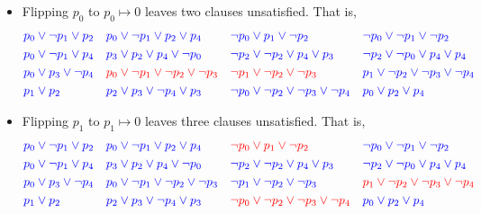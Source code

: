 \documentclass[11pt,a4paper]{article}
\begin{document}
\begin{itemize}
\item Flipping $p_0$ to $p_0 \mapsto 0$ leaves two clauses unsatisfied. That is,
\begin{align*}
&\textcolor{blue}{p_0 \lor \neg p_1 \lor p_2} & & \textcolor{blue}{p_0 \lor \neg p_1 \lor p_2 \lor p_4} & & \textcolor{blue}{\neg p_0 \lor p_1 \lor \neg p_2} & & \textcolor{blue}{\neg p_0 \lor \neg p_1 \lor \neg p_2} \\
&\textcolor{blue}{ p_0 \lor \neg p_1 \lor p_4} && \textcolor{blue}{p_3 \lor p_2 \lor p_4 \lor \neg p_0} && \textcolor{blue}{\neg p_2 \lor \neg p_2 \lor p_4 \lor p_3} && \textcolor{blue}{\neg p_2 \lor \neg p_0 \lor p_4 \lor p_4} \\
& \textcolor{blue}{p_0 \lor p_3 \lor \neg p_4} && \textcolor{red}{p_0 \lor \neg p_1 \lor \neg p_2 \lor \neg p_3} && \textcolor{red}{\neg p_1 \lor \neg p_2 \lor \neg p_3} && \textcolor{blue}{p_1 \lor \neg p_2 \lor \neg p_3 \lor \neg p_4} \\
& \textcolor{blue}{p_1 \lor p_2} && \textcolor{blue}{p_2 \lor p_3 \lor \neg p_4 \lor p_3} && \textcolor{blue}{\neg p_0 \lor \neg p_2 \lor \neg p_3 \lor \neg p_4} && \textcolor{blue}{p_0 \lor p_2 \lor p_4} \\
\end{align*}
\item Flipping $p_1$ to $p_1 \mapsto 0$ leaves three clauses unsatisfied. That is,
\begin{align*}
&\textcolor{blue}{p_0 \lor \neg p_1 \lor p_2} & & \textcolor{blue}{p_0 \lor \neg p_1 \lor p_2 \lor p_4} & & \textcolor{red}{\neg p_0 \lor p_1 \lor \neg p_2} & & \textcolor{blue}{\neg p_0 \lor \neg p_1 \lor \neg p_2} \\
&\textcolor{blue}{ p_0 \lor \neg p_1 \lor p_4} && \textcolor{blue}{p_3 \lor p_2 \lor p_4 \lor \neg p_0} && \textcolor{blue}{\neg p_2 \lor \neg p_2 \lor p_4 \lor p_3} && \textcolor{blue}{\neg p_2 \lor \neg p_0 \lor p_4 \lor p_4} \\
& \textcolor{blue}{p_0 \lor p_3 \lor \neg p_4} && \textcolor{blue}{p_0 \lor \neg p_1 \lor \neg p_2 \lor \neg p_3} && \textcolor{blue}{\neg p_1 \lor \neg p_2 \lor \neg p_3} && \textcolor{red}{p_1 \lor \neg p_2 \lor \neg p_3 \lor \neg p_4} \\
& \textcolor{blue}{p_1 \lor p_2} && \textcolor{blue}{p_2 \lor p_3 \lor \neg p_4 \lor p_3} && \textcolor{red}{\neg p_0 \lor \neg p_2 \lor \neg p_3 \lor \neg p_4} && \textcolor{blue}{p_0 \lor p_2 \lor p_4} \\
\end{align*}


\end{itemize}
\end{document}
